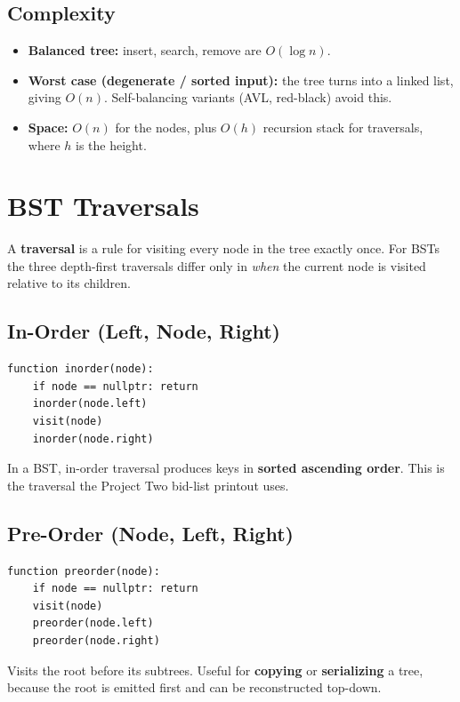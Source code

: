 \documentclass[11pt]{article}
\begin{document}
\subsection*{Complexity}
\begin{itemize}[leftmargin=*]
    \item \textbf{Balanced tree:} insert, search, remove are
          $O(\log n)$.
    \item \textbf{Worst case (degenerate / sorted input):} the tree
          turns into a linked list, giving $O(n)$. Self-balancing
          variants (AVL, red-black) avoid this.
    \item \textbf{Space:} $O(n)$ for the nodes, plus $O(h)$ recursion
          stack for traversals, where $h$ is the height.
\end{itemize}

\section{BST Traversals}

A \textbf{traversal} is a rule for visiting every node in the tree
exactly once. For BSTs the three depth-first traversals differ only in
\emph{when} the current node is visited relative to its children.

\subsection*{In-Order (Left, Node, Right)}
\begin{lstlisting}[basicstyle=\ttfamily\small,frame=single]
function inorder(node):
    if node == nullptr: return
    inorder(node.left)
    visit(node)
    inorder(node.right)
\end{lstlisting}
In a BST, in-order traversal produces keys in \textbf{sorted ascending
order}. This is the traversal the Project Two bid-list printout uses.

\subsection*{Pre-Order (Node, Left, Right)}
\begin{lstlisting}[basicstyle=\ttfamily\small,frame=single]
function preorder(node):
    if node == nullptr: return
    visit(node)
    preorder(node.left)
    preorder(node.right)
\end{lstlisting}
Visits the root before its subtrees. Useful for \textbf{copying} or
\textbf{serializing} a tree, because the root is emitted first and can
be reconstructed top-down.
\end{document}
